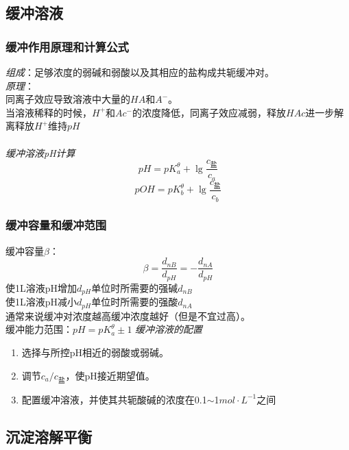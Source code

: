 \documentclass[utf8,a4paper,12pt]{ctexart}
\begin{document}
\subsection{缓冲溶液}
\subsubsection{缓冲作用原理和计算公式}
\emph{组成}：足够浓度的弱碱和弱酸以及其相应的盐构成共轭缓冲对。\\
\emph{原理}：\\
同离子效应导致溶液中大量的$HA$和$A^{-}$。\\
当溶液稀释的时候，$H^{+}$和$Ac^{-}$的浓度降低，同离子效应减弱，释放$HAc$进一步解离释放$H^{+}$维持$pH$\\\\
\emph{缓冲溶液pH计算}
\begin{equation}
pH = pK_{a}^{\theta} + \lg\frac{c_{\text{盐}}}{c_{a}}
\end{equation}
\[
pOH = pK_{b}^{\theta} + \lg\frac{c_{\text{盐}}}{c_{b}}
\]
\subsubsection{缓冲容量和缓冲范围}
缓冲容量$\beta$：
\[
\beta = \frac{d_{nB}}{d_{pH}} = -\frac{d_{nA}}{d_{pH}}
\]
使1L溶液pH增加$d_{pH}$单位时所需要的强碱$d_{nB}$\\
使1L溶液pH减小$d_{pH}$单位时所需要的强酸$d_{nA}$\\
通常来说缓冲对浓度越高缓冲浓度越好（但是不宜过高）。\\
缓冲能力范围：$pH = pK_{a}^{\theta} \pm 1$
\emph{缓冲溶液的配置}
\begin{enumerate}
\item 选择与所控pH相近的弱酸或弱碱。
\item 调节$c_{a}/c_{\text{盐}}$，使pH接近期望值。
\item 配置缓冲溶液，并使其共轭酸碱的浓度在0.1$\sim$1$mol\cdot L^{-1}$之间
\end{enumerate}

\subsection{沉淀溶解平衡}
\end{document}
